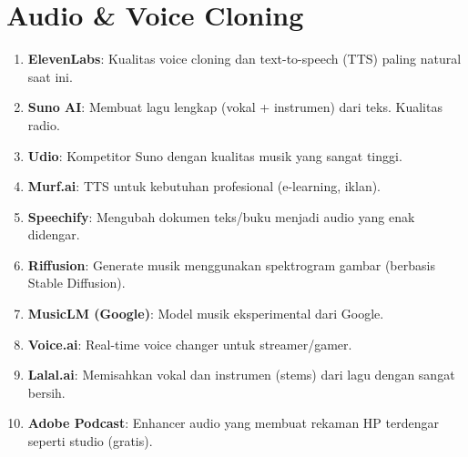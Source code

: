 \section{Audio \& Voice Cloning}
\begin{enumerate}
    \item \textbf{ElevenLabs}: Kualitas voice cloning dan text-to-speech (TTS) paling natural saat ini.
    \item \textbf{Suno AI}: Membuat lagu lengkap (vokal + instrumen) dari teks. Kualitas radio.
    \item \textbf{Udio}: Kompetitor Suno dengan kualitas musik yang sangat tinggi.
    \item \textbf{Murf.ai}: TTS untuk kebutuhan profesional (e-learning, iklan).
    \item \textbf{Speechify}: Mengubah dokumen teks/buku menjadi audio yang enak didengar.
    \item \textbf{Riffusion}: Generate musik menggunakan spektrogram gambar (berbasis Stable Diffusion).
    \item \textbf{MusicLM (Google)}: Model musik eksperimental dari Google.
    \item \textbf{Voice.ai}: Real-time voice changer untuk streamer/gamer.
    \item \textbf{Lalal.ai}: Memisahkan vokal dan instrumen (stems) dari lagu dengan sangat bersih.
    \item \textbf{Adobe Podcast}: Enhancer audio yang membuat rekaman HP terdengar seperti studio (gratis).
\end{enumerate}


